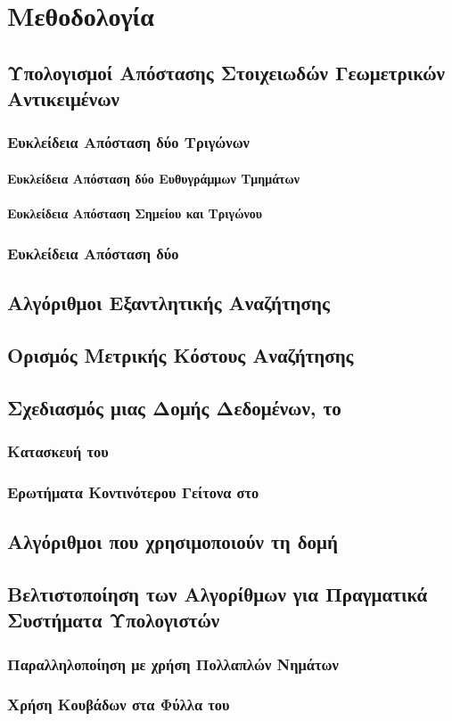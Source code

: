 \chapter{Μεθοδολογία}
\label{ch:methodology}

\section{Υπολογισμοί Απόστασης Στοιχειωδών Γεωμετρικών Αντικειμένων}
\subsection{Ευκλείδεια Απόσταση δύο Τριγώνων}
\label{subsec:tria_distance}
\subsubsection{Ευκλείδεια Απόσταση δύο Ευθυγράμμων Τμημάτων}
\subsubsection{Ευκλείδεια Απόσταση Σημείου και Τριγώνου}
\subsection{Ευκλείδεια Απόσταση δύο }

\section{Αλγόριθμοι Εξαντλητικής Αναζήτησης}
\label{sec:exhaustive_search}

\section{Ορισμός Μετρικής Κόστους Αναζήτησης}
\label{sec:cost_metric}

\section{Σχεδιασμός μιας  Δομής Δεδομένων, το }
\subsection{Κατασκευή του }
\subsection{Ερωτήματα Κοντινότερου Γείτονα στο }

\section{Αλγόριθμοι που χρησιμοποιούν τη δομή }

\section{Βελτιστοποίηση των Αλγορίθμων για Πραγματικά Συστήματα Υπολογιστών}
\subsection{Παραλληλοποίηση με χρήση Πολλαπλών Νημάτων }
\subsection{Χρήση Κουβάδων στα Φύλλα του }